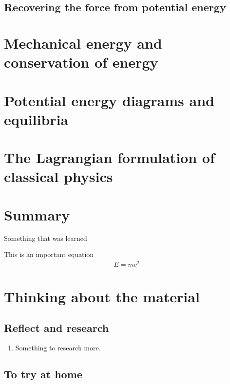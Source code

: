 \subsection{Recovering the force from potential energy}

\section{Mechanical energy and conservation of energy}

\section{Potential energy diagrams and equilibria}

\section{The Lagrangian formulation of classical physics}



\newpage
\section{Summary}

\begin{chapterSummary}{
\item Something that was learned
}
\end{chapterSummary}

\newpage
\begin{importantEquations}
This is an important equation
\begin{align*}
E = mc^2
\end{align*}

\end{importantEquations}


\newpage
\section{Thinking about the material}
\subsection{Reflect and research}

\begin{enumerate}
\item Something to research more.
\end{enumerate}
\subsection{To try at home}

